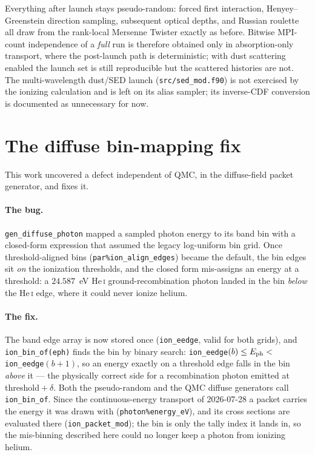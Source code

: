 \documentclass[english,a4paper]{my_memo}
\newcommand{\code}[1]{\texttt{#1}}
\begin{document}
Everything after launch stays pseudo-random: forced first interaction,
Henyey--Greenstein direction sampling, subsequent optical depths, and Russian
roulette all draw from the rank-local Mersenne Twister exactly as before.
Bitwise MPI-count independence of a \emph{full} run is therefore obtained only
in absorption-only transport, where the post-launch path is deterministic; with
dust scattering enabled the launch set is still reproducible but the scattered
histories are not.  The multi-wavelength dust/SED launch (\code{src/sed\_mod.f90})
is not exercised by the ionizing calculation and is left on its alias sampler; its
inverse-CDF conversion is documented as unnecessary for now.

\section{The diffuse bin-mapping fix}
\label{sec:binfix}
This work uncovered a defect independent of QMC, in the diffuse-field packet
generator, and fixes it.

\paragraph{The bug.}  \code{gen\_diffuse\_photon} mapped a sampled photon energy
to its band bin with a closed-form expression that assumed the legacy
log-uniform bin grid.  Once threshold-aligned bins
(\code{par\%ion\_align\_edges}) became the default, the bin edges sit \emph{on}
the ionization thresholds, and the closed form mis-assigns an energy at a
threshold: a $24.587$~eV He\,\textsc{i} ground-recombination photon landed in
the bin \emph{below} the He\,\textsc{i} edge, where it could never ionize
helium.

\paragraph{The fix.}  The band edge array is now stored once
(\code{ion\_eedge}, valid for both grids), and \code{ion\_bin\_of(eph)} finds
the bin by binary search: \code{ion\_eedge}$(b) \le E_{\rm ph} <
{}$\code{ion\_eedge}$(b{+}1)$, so an energy exactly on a threshold edge falls in
the bin \emph{above} it --- the physically correct side for a recombination
photon emitted at threshold${}+\delta$.  Both the pseudo-random and the QMC
diffuse generators call \code{ion\_bin\_of}.  Since the continuous-energy
transport of 2026-07-28 a packet carries the energy it was drawn with
(\code{photon\%energy\_eV}), and its cross sections are evaluated there
(\code{ion\_packet\_mod}); the bin is only the tally index it lands in, so the
mis-binning described here could no longer keep a photon from ionizing helium.
\end{document}
